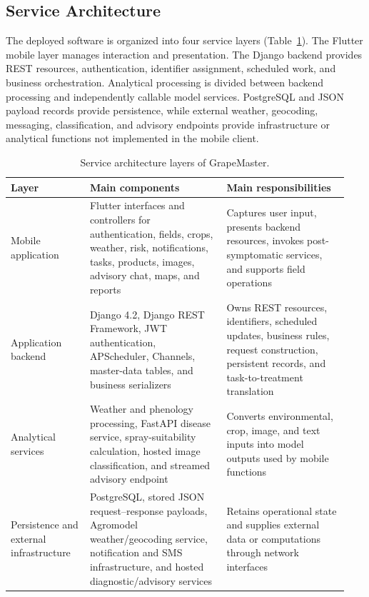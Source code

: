\documentclass[12pt]{article}
\newcommand{\tablefontsize}{\fontsize{9pt}{11pt}\selectfont}
\begin{document}
\subsection{Service Architecture}\label{service-architecture}

The deployed software is organized into four service layers (Table~\ref{tab:architecture_layers}). The Flutter mobile layer manages interaction and presentation. The Django backend provides REST resources, authentication, identifier assignment, scheduled work, and business orchestration. Analytical processing is divided between backend processing and independently callable model services. PostgreSQL and JSON payload records provide persistence, while external weather, geocoding, messaging, classification, and advisory endpoints provide infrastructure or analytical functions not implemented in the mobile client.

\begin{table}[H]
\centering
\caption{Service architecture layers of GrapeMaster.}
\label{tab:architecture_layers}
\tablefontsize
\begin{tabular}{@{}p{0.22\linewidth} p{0.38\linewidth} p{0.34\linewidth}@{}}
\toprule
Layer & Main components & Main responsibilities \\
\midrule
Mobile application & Flutter interfaces and controllers for authentication, fields, crops, weather, risk, notifications, tasks, products, images, advisory chat, maps, and reports & Captures user input, presents backend resources, invokes post-symptomatic services, and supports field operations \\
Application backend & Django 4.2, Django REST Framework, JWT authentication, APScheduler, Channels, master-data tables, and business serializers & Owns REST resources, identifiers, scheduled updates, business rules, request construction, persistent records, and task-to-treatment translation \\
Analytical services & Weather and phenology processing, FastAPI disease service, spray-suitability calculation, hosted image classification, and streamed advisory endpoint & Converts environmental, crop, image, and text inputs into model outputs used by mobile functions \\
Persistence and external infrastructure & PostgreSQL, stored JSON request--response payloads, Agromodel weather/geocoding service, notification and SMS infrastructure, and hosted diagnostic/advisory services & Retains operational state and supplies external data or computations through network interfaces \\
\bottomrule
\end{tabular}
\end{table}
\end{document}
